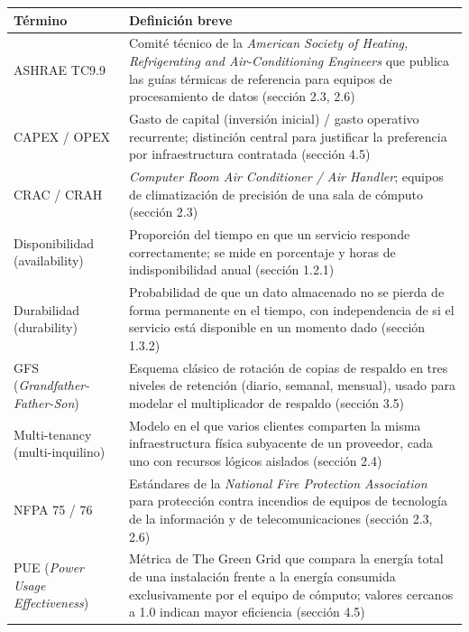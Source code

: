 \documentclass[11pt,a4paper]{article}
\begin{document}
{\small
\begin{longtable}[]{@{}
  >{\raggedright\arraybackslash}p{}
  >{\raggedright\arraybackslash}p{}@{}}
\toprule\noalign{}
\begin{minipage}[b]{\linewidth}\raggedright
Término
\end{minipage} & \begin{minipage}[b]{\linewidth}\raggedright
Definición breve
\end{minipage} \\
\midrule\noalign{}
\endhead
\bottomrule\noalign{}
\endlastfoot
ASHRAE TC9.9 & Comité técnico de la \emph{American Society of Heating, Refrigerating and Air-Conditioning Engineers} que publica las guías térmicas de referencia para equipos de procesamiento de datos (sección 2.3, 2.6) \\
CAPEX / OPEX & Gasto de capital (inversión inicial) / gasto operativo recurrente; distinción central para justificar la preferencia por infraestructura contratada (sección 4.5) \\
CRAC / CRAH & \emph{Computer Room Air Conditioner / Air Handler}; equipos de climatización de precisión de una sala de cómputo (sección 2.3) \\
Disponibilidad (availability) & Proporción del tiempo en que un servicio responde correctamente; se mide en porcentaje y horas de indisponibilidad anual (sección 1.2.1) \\
Durabilidad (durability) & Probabilidad de que un dato almacenado no se pierda de forma permanente en el tiempo, con independencia de si el servicio está disponible en un momento dado (sección 1.3.2) \\
GFS (\emph{Grandfather-Father-Son}) & Esquema clásico de rotación de copias de respaldo en tres niveles de retención (diario, semanal, mensual), usado para modelar el multiplicador de respaldo (sección 3.5) \\
Multi-tenancy (multi-inquilino) & Modelo en el que varios clientes comparten la misma infraestructura física subyacente de un proveedor, cada uno con recursos lógicos aislados (sección 2.4) \\
NFPA 75 / 76 & Estándares de la \emph{National Fire Protection Association} para protección contra incendios de equipos de tecnología de la información y de telecomunicaciones (sección 2.3, 2.6) \\
PUE (\emph{Power Usage Effectiveness}) & Métrica de The Green Grid que compara la energía total de una instalación frente a la energía consumida exclusivamente por el equipo de cómputo; valores cercanos a 1.0 indican mayor eficiencia (sección 4.5) \\

\end{longtable}}
\end{document}
